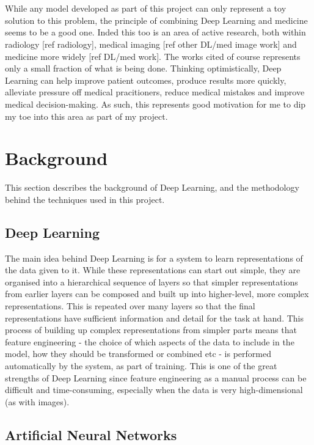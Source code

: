 \documentclass[11pt]{article} %
\theoremstyle{plain}
\theoremstyle{definition}
\begin{document}
\\
\\
\noindent
While any model developed as part of this project can only represent a toy solution to this problem, the principle of combining Deep Learning and medicine seems to be a good one. Inded this too is an area of active research, both within radiology [ref radiology], medical imaging [ref other DL/med image work] and medicine more widely [ref DL/med work]. The works cited of course represents only a small fraction of what is being done. Thinking optimistically, Deep Learning can help improve patient outcomes, produce results more quickly, alleviate pressure off medical pracitioners, reduce medical mistakes and improve medical decision-making. As such, this represents good motivation for me to dip my toe into this area as part of my project.



\newpage
\section{Background}
This section describes the background of Deep Learning, and the methodology behind the techniques used in this project.

\subsection{Deep Learning}
The main idea behind Deep Learning is for a system to learn representations of the data given to it. While these representations can start out simple, they are organised into a hierarchical sequence of layers so that simpler representations from earlier layers can be composed and built up into higher-level, more complex representations. This is repeated over many layers so that the final representations have sufficient information and detail for the task at hand. This process of building up complex representations from simpler parts means that feature engineering - the choice of which aspects of the data to include in the model, how they should be transformed or combined etc - is performed automatically by the system, as part of training. This is one of the great strengths of Deep Learning since feature engineering as a manual process can be difficult and time-consuming, especially when the data is very high-dimensional (as with images).       

\subsection{Artificial Neural Networks}
\end{document}
